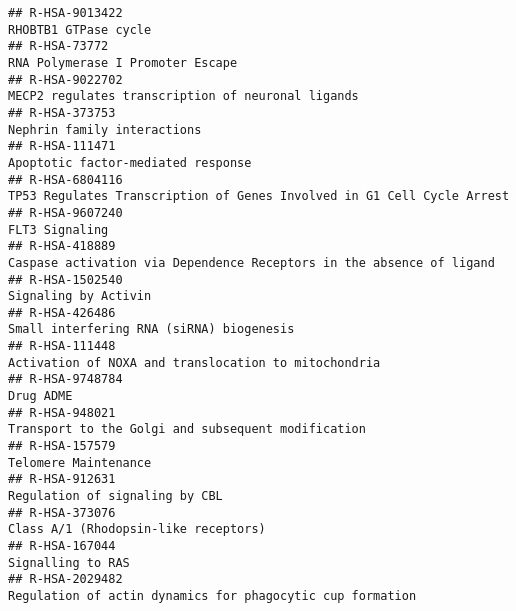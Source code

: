 \documentclass[
]{article}
\begin{document}
\begin{verbatim}
## R-HSA-9013422                                                                                                                 RHOBTB1 GTPase cycle
## R-HSA-73772                                                                                                       RNA Polymerase I Promoter Escape
## R-HSA-9022702                                                                                    MECP2 regulates transcription of neuronal ligands
## R-HSA-373753                                                                                                           Nephrin family interactions
## R-HSA-111471                                                                                                    Apoptotic factor-mediated response
## R-HSA-6804116                                                               TP53 Regulates Transcription of Genes Involved in G1 Cell Cycle Arrest
## R-HSA-9607240                                                                                                                       FLT3 Signaling
## R-HSA-418889                                                                  Caspase activation via Dependence Receptors in the absence of ligand
## R-HSA-1502540                                                                                                                 Signaling by Activin
## R-HSA-426486                                                                                              Small interfering RNA (siRNA) biogenesis
## R-HSA-111448                                                                                  Activation of NOXA and translocation to mitochondria
## R-HSA-9748784                                                                                                                            Drug ADME
## R-HSA-948021                                                                                    Transport to the Golgi and subsequent modification
## R-HSA-157579                                                                                                                  Telomere Maintenance
## R-HSA-912631                                                                                                        Regulation of signaling by CBL
## R-HSA-373076                                                                                                  Class A/1 (Rhodopsin-like receptors)
## R-HSA-167044                                                                                                                     Signalling to RAS
## R-HSA-2029482                                                                            Regulation of actin dynamics for phagocytic cup formation

\end{verbatim}
\end{document}
